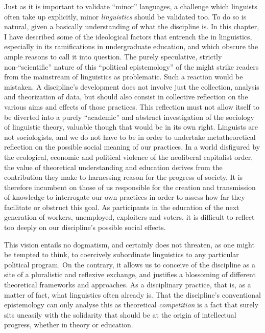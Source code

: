 \documentclass[output=paper]{langscibook}
\begin{document}
Just as it is important to validate ``minor'' languages, a challenge which linguists often take up explicitly, minor \emph{linguistics} should be validated too. To do so is natural, given a basically  understanding of what the discipline is. In this chapter, I have described some of the ideological factors that entrench the  in linguistics, especially in its ramifications in undergraduate education, and which obscure the ample reasons to call it into question. The purely speculative, strictly non-``scientific'' nature of this ``political epistemology'' of the  might strike readers from the mainstream of linguistics as problematic. Such a reaction would be mistaken. A discipline's development does not involve just the collection, analysis and theorization of data, but should also consist in collective reflection on the various aims and effects of those practices. This reflection must not allow itself to be diverted into a purely ``academic'' and abstract investigation of the sociology of linguistic theory, valuable though that would be in its own right. Linguists are not sociologists, and we do not have to be in order to undertake metatheoretical reflection on the possible social meaning of our practices. In a world disfigured by the ecological, economic and political violence of the neoliberal capitalist order, the value of theoretical understanding and education derives from the contribution they make to harnessing reason for the progress of society. It is therefore incumbent on those of us responsible for the creation and transmission of knowledge to interrogate our own practices in order to assess how far they facilitate or obstruct this goal. As participants in the education of the next generation of workers, unemployed, exploiters and voters, it is difficult to reflect too deeply on our discipline's possible social effects.

This vision entails no dogmatism, and certainly does not threaten, as one might be tempted to think, to coercively subordinate linguistics to any particular political program. On the contrary, it allows us to conceive of the discipline as a site of a pluralistic and reflexive exchange, and justifies a blossoming of different theoretical frameworks and approaches. As a disciplinary practice, that is, as a matter of fact, what linguistics often already is. That the discipline's conventional epistemology can only analyse this as theoretical \emph{competition} is a fact that surely sits uneasily with the solidarity that should be at the origin of intellectual progress, whether in theory or education.

\sloppy
\printbibliography[heading=subbibliography,notkeyword=this] 
\end{document}
